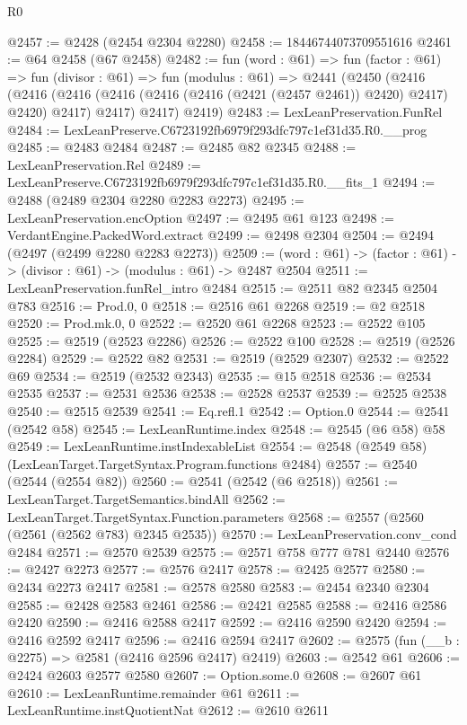 \begin{lexlean}{R0}
\begin{coremodule}
@2457 := @2428 (@2454 @2304 @2280)
@2458 := 18446744073709551616
@2461 := @64 @2458 (@67 @2458)
@2482 := fun (word : @61) =>
  fun (factor : @61) =>
  fun (divisor : @61) =>
  fun (modulus : @61) =>
  @2441
    (@2450
      (@2416
        (@2416 (@2416 (@2416 (@2416 (@2416 (@2421 (@2457 @2461)) @2420) @2417) @2420) @2417) @2417)
        @2417)
      @2419)
@2483 := LexLeanPreservation.FunRel
@2484 := LexLeanPreserve.C6723192fb6979f293dfc797c1ef31d35.R0.__prog
@2485 := @2483 @2484
@2487 := @2485 @82 @2345
@2488 := LexLeanPreservation.Rel
@2489 := LexLeanPreserve.C6723192fb6979f293dfc797c1ef31d35.R0.__fits_1
@2494 := @2488 (@2489 @2304 @2280 @2283 @2273)
@2495 := LexLeanPreservation.encOption
@2497 := @2495 @61 @123
@2498 := VerdantEngine.PackedWord.extract
@2499 := @2498 @2304
@2504 := @2494 (@2497 (@2499 @2280 @2283 @2273))
@2509 := (word : @61) -> (factor : @61) -> (divisor : @61) -> (modulus : @61) -> @2487 @2504
@2511 := LexLeanPreservation.funRel_intro @2484
@2515 := @2511 @82 @2345 @2504 @783
@2516 := Prod.{0, 0}
@2518 := @2516 @61 @2268
@2519 := @2 @2518
@2520 := Prod.mk.{0, 0}
@2522 := @2520 @61 @2268
@2523 := @2522 @105
@2525 := @2519 (@2523 @2286)
@2526 := @2522 @100
@2528 := @2519 (@2526 @2284)
@2529 := @2522 @82
@2531 := @2519 (@2529 @2307)
@2532 := @2522 @69
@2534 := @2519 (@2532 @2343)
@2535 := @15 @2518
@2536 := @2534 @2535
@2537 := @2531 @2536
@2538 := @2528 @2537
@2539 := @2525 @2538
@2540 := @2515 @2539
@2541 := Eq.refl.{1}
@2542 := Option.{0}
@2544 := @2541 (@2542 @58)
@2545 := LexLeanRuntime.index
@2548 := @2545 (@6 @58) @58
@2549 := LexLeanRuntime.instIndexableList
@2554 := @2548 (@2549 @58) (LexLeanTarget.TargetSyntax.Program.functions @2484)
@2557 := @2540 (@2544 (@2554 @82))
@2560 := @2541 (@2542 (@6 @2518))
@2561 := LexLeanTarget.TargetSemantics.bindAll
@2562 := LexLeanTarget.TargetSyntax.Function.parameters
@2568 := @2557 (@2560 (@2561 (@2562 @783) @2345 @2535))
@2570 := LexLeanPreservation.conv_cond @2484
@2571 := @2570 @2539
@2575 := @2571 @758 @777 @781 @2440
@2576 := @2427 @2273
@2577 := @2576 @2417
@2578 := @2425 @2577
@2580 := @2434 @2273 @2417
@2581 := @2578 @2580
@2583 := @2454 @2340 @2304
@2585 := @2428 @2583 @2461
@2586 := @2421 @2585
@2588 := @2416 @2586 @2420
@2590 := @2416 @2588 @2417
@2592 := @2416 @2590 @2420
@2594 := @2416 @2592 @2417
@2596 := @2416 @2594 @2417
@2602 := @2575 (fun (__b : @2275) => @2581 (@2416 @2596 @2417) @2419)
@2603 := @2542 @61
@2606 := @2424 @2603 @2577 @2580
@2607 := Option.some.{0}
@2608 := @2607 @61
@2610 := LexLeanRuntime.remainder @61
@2611 := LexLeanRuntime.instQuotientNat
@2612 := @2610 @2611

\end{coremodule}
\end{lexlean}
